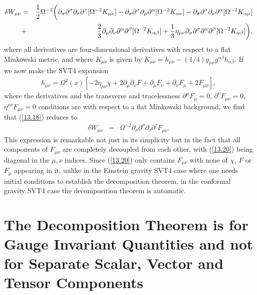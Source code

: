 \documentclass[aps,onecolumn,10pt]{revtex4}
\numberwithin{equation}{section}
\numberwithin{equation}{section}
\begin{document}
%
\begin{eqnarray}
\delta W_{\mu\nu}&=&\frac{1}{2}\Omega^{-2}\bigg{(}\partial_{\sigma}\partial^{\sigma}\partial_{\tau}\partial^{\tau}[\Omega^{-2}K_{\mu\nu}]
-\partial_{\sigma}\partial^{\sigma}\partial_{\mu}\partial^{\alpha}[\Omega^{-2}K_{\alpha\nu}]
-\partial_{\sigma}\partial^{\sigma}\partial_{\nu}\partial^{\alpha}[\Omega^{-2}K_{\alpha\mu}]
\nonumber\\
&+&\frac{2}{3}\partial_{\mu}\partial_{\nu}\partial^{\alpha}\partial^{\beta}[\Omega^{-2}K_{\alpha\beta}]+\frac{1}{3}\eta_{\mu\nu}\partial_{\sigma}\partial^{\sigma}\partial^{\alpha}\partial^{\beta}[\Omega^{-2}K_{\alpha\beta}]\bigg{)},
\label{13.18}
\end{eqnarray} 
%
where all derivatives are four-dimensional derivatives with respect to a flat Minkowski metric, and where $K_{\mu\nu}$ is given by $K_{\mu\nu}=h_{\mu\nu}-(1/4)g_{\mu\nu}g^{\alpha\beta}h_{\alpha\beta}$. If we now make the SVT4 expansion
%
\begin{eqnarray}
h_{\mu\nu}=\Omega^2(x)\left[-2\eta_{\mu\nu}\chi+2\partial_{\mu}\partial_{\nu}F
+ \partial_{\mu}F_{\nu}+\partial_{\nu}F_{\mu}+2F_{\mu\nu}\right],
\label{13.19}
\end{eqnarray}
%
where the derivatives and the transverse and tracelessness  $\partial^{\mu}F_{\mu}=0$, $\partial^{\nu}F_{\mu\nu}=0$, $\eta^{\mu\nu}F_{\mu\nu}=0$ conditions are with respect to a flat Minkowski background, we find that (\ref{13.18}) reduces to
%
\begin{eqnarray}
\delta W_{\mu\nu}&=&\Omega^{-2}\partial_{\sigma}\partial^{\sigma}\partial_{\tau}\partial^{\tau}F_{\mu\nu}.
\label{13.20}
\end{eqnarray} 
%
This expression is remarkable not just in its simplicity but in the fact that all components of $F_{\mu\nu}$ are completely decoupled from each other, with (\ref{13.20}) being diagonal in the $\mu,\nu$ indices. Since (\ref{13.20}) only contains $F_{\mu\nu}$ with none of $\chi$, $F$ or $F_{\mu}$ appearing  in it, unlike in the Einstein gravity SVT4 case where one needs initial conditions to establish the decomposition theorem, in the conformal gravity SVT4 case the decomposition theorem is automatic.

\section{The Decomposition Theorem is for Gauge Invariant Quantities and not for Separate Scalar, Vector and Tensor Components}
\label{S14}
\end{document}
